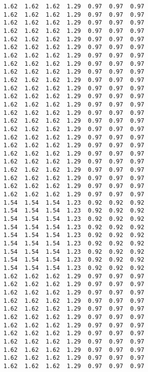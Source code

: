 \begin{lstlisting}
1.62  1.62  1.62  1.29  0.97  0.97  0.97
1.62  1.62  1.62  1.29  0.97  0.97  0.97
1.62  1.62  1.62  1.29  0.97  0.97  0.97
1.62  1.62  1.62  1.29  0.97  0.97  0.97
1.62  1.62  1.62  1.29  0.97  0.97  0.97
1.62  1.62  1.62  1.29  0.97  0.97  0.97
1.62  1.62  1.62  1.29  0.97  0.97  0.97
1.62  1.62  1.62  1.29  0.97  0.97  0.97
1.62  1.62  1.62  1.29  0.97  0.97  0.97
1.62  1.62  1.62  1.29  0.97  0.97  0.97
1.62  1.62  1.62  1.29  0.97  0.97  0.97
1.62  1.62  1.62  1.29  0.97  0.97  0.97
1.62  1.62  1.62  1.29  0.97  0.97  0.97
1.62  1.62  1.62  1.29  0.97  0.97  0.97
1.62  1.62  1.62  1.29  0.97  0.97  0.97
1.62  1.62  1.62  1.29  0.97  0.97  0.97
1.62  1.62  1.62  1.29  0.97  0.97  0.97
1.62  1.62  1.62  1.29  0.97  0.97  0.97
1.62  1.62  1.62  1.29  0.97  0.97  0.97
1.62  1.62  1.62  1.29  0.97  0.97  0.97
1.62  1.62  1.62  1.29  0.97  0.97  0.97
1.62  1.62  1.62  1.29  0.97  0.97  0.97
1.62  1.62  1.62  1.29  0.97  0.97  0.97
1.62  1.62  1.62  1.29  0.97  0.97  0.97
1.54  1.54  1.54  1.23  0.92  0.92  0.92
1.54  1.54  1.54  1.23  0.92  0.92  0.92
1.54  1.54  1.54  1.23  0.92  0.92  0.92
1.54  1.54  1.54  1.23  0.92  0.92  0.92
1.54  1.54  1.54  1.23  0.92  0.92  0.92
1.54  1.54  1.54  1.23  0.92  0.92  0.92
1.54  1.54  1.54  1.23  0.92  0.92  0.92
1.54  1.54  1.54  1.23  0.92  0.92  0.92
1.54  1.54  1.54  1.23  0.92  0.92  0.92
1.62  1.62  1.62  1.29  0.97  0.97  0.97
1.62  1.62  1.62  1.29  0.97  0.97  0.97
1.62  1.62  1.62  1.29  0.97  0.97  0.97
1.62  1.62  1.62  1.29  0.97  0.97  0.97
1.62  1.62  1.62  1.29  0.97  0.97  0.97
1.62  1.62  1.62  1.29  0.97  0.97  0.97
1.62  1.62  1.62  1.29  0.97  0.97  0.97
1.62  1.62  1.62  1.29  0.97  0.97  0.97
1.62  1.62  1.62  1.29  0.97  0.97  0.97
1.62  1.62  1.62  1.29  0.97  0.97  0.97
1.62  1.62  1.62  1.29  0.97  0.97  0.97
1.62  1.62  1.62  1.29  0.97  0.97  0.97


\end{lstlisting}

